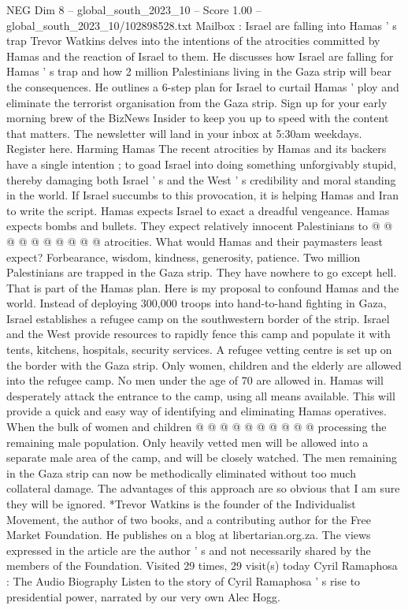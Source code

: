 \begin{textsample}{NEG Dim 8 – global\_south\_2023\_10 – Score 1.00 – global\_south\_2023\_10/102898528.txt}  \label{ex:f8_neg_099}
Mailbox : Israel are falling into Hamas ' s trap Trevor Watkins delves into the intentions of the atrocities committed by Hamas and the reaction of Israel to them.
He discusses how Israel are falling for Hamas ' s trap and how 2 million Palestinians living in the Gaza strip will bear the consequences.
He outlines a 6-step plan for Israel to curtail Hamas ' ploy and eliminate the terrorist organisation from the Gaza strip.
Sign up for your early morning brew of the BizNews Insider to keep you up to speed with the content that matters.
The newsletter will land in your inbox at 5:30am weekdays.
Register here.
Harming Hamas The recent atrocities by Hamas and its backers have a single intention ; to goad Israel into doing something unforgivably stupid, thereby damaging both Israel ' s and the West ' s credibility and moral standing in the world.
If Israel succumbs to this provocation, it is helping Hamas and Iran to write the script.
Hamas expects Israel to exact a dreadful vengeance.
Hamas expects bombs and bullets.
They expect relatively innocent Palestinians to @ @ @ @ @ @ @ @ @ @ atrocities.
What would Hamas and their paymasters least expect?
Forbearance, wisdom, kindness, generosity, patience.
Two million Palestinians are trapped in the Gaza strip.
They have nowhere to go except hell.
That is part of the Hamas plan.
Here is my proposal to confound Hamas and the world.
Instead of deploying 300,000 troops into hand-to-hand fighting in Gaza, Israel establishes a refugee camp on the southwestern border of the strip.
Israel and the West provide resources to rapidly fence this camp and populate it with tents, kitchens, hospitals, security services.
A refugee vetting centre is set up on the border with the Gaza strip.
Only women, children and the elderly are allowed into the refugee camp.
No men under the age of 70 are allowed in.
Hamas will desperately attack the entrance to the camp, using all means available.
This will provide a quick and easy way of identifying and eliminating Hamas operatives.
When the bulk of women and children @ @ @ @ @ @ @ @ @ @ processing the remaining male population.
Only heavily vetted men will be allowed into a separate male area of the camp, and will be closely watched.
The men remaining in the Gaza strip can now be methodically eliminated without too much collateral damage.
The advantages of this approach are so obvious that I am sure they will be ignored. *Trevor Watkins is the founder of the Individualist Movement, the author of two books, and a contributing author for the Free Market Foundation.
He publishes on a blog at libertarian.org.za.
The views expressed in the article are the author ' s and not necessarily shared by the members of the Foundation.
Visited 29 times, 29 visit(s) today Cyril Ramaphosa : The Audio Biography Listen to the story of Cyril Ramaphosa ' s rise to presidential power, narrated by our very own Alec Hogg.

\end{textsample}

